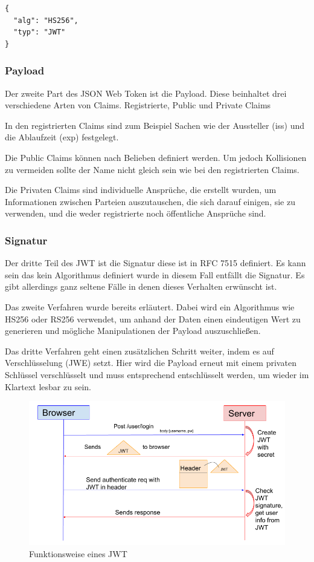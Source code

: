 \begin{lstlisting}
{
  "alg": "HS256",
  "typ": "JWT"
}
\end{lstlisting}

\subsubsection{Payload}
Der zweite Part des JSON Web Token ist die Payload. Diese beinhaltet drei verschiedene Arten von Claims. 
Registrierte, Public und Private Claims

In den registrierten Claims sind zum Beispiel Sachen wie der Aussteller (iss) und die Ablaufzeit (exp) festgelegt.

Die Public Claims können nach Belieben definiert werden. Um jedoch Kollisionen zu vermeiden sollte der Name nicht gleich sein wie bei den registrierten Claims.

Die Privaten Claims sind individuelle Ansprüche, die erstellt wurden, um Informationen zwischen Parteien auszutauschen, die sich darauf einigen, sie zu verwenden, und die weder registrierte noch öffentliche Ansprüche sind.


\subsubsection{Signatur}

Der dritte Teil des JWT ist die Signatur diese ist in RFC 7515 definiert. Es kann sein das kein Algorithmus definiert wurde in diesem Fall entfällt die Signatur. Es gibt allerdings ganz seltene Fälle in denen dieses Verhalten erwünscht ist. 



Das zweite Verfahren wurde bereits erläutert. Dabei wird ein Algorithmus wie HS256 oder RS256 verwendet, um anhand der Daten einen eindeutigen Wert zu generieren und mögliche Manipulationen der Payload auszuschließen.



Das dritte Verfahren geht einen zusätzlichen Schritt weiter, indem es auf Verschlüsselung (JWE) setzt. Hier wird die Payload erneut mit einem privaten Schlüssel verschlüsselt und muss entsprechend entschlüsselt werden, um wieder im Klartext lesbar zu sein.


\begin{figure}[h!]
    \centering
    \includegraphics[width=0.7\linewidth]{pics/jwt-funktion.png}
    \caption{Funktionsweise eines JWT}
    \label{fig:enter-label}
\end{figure}

